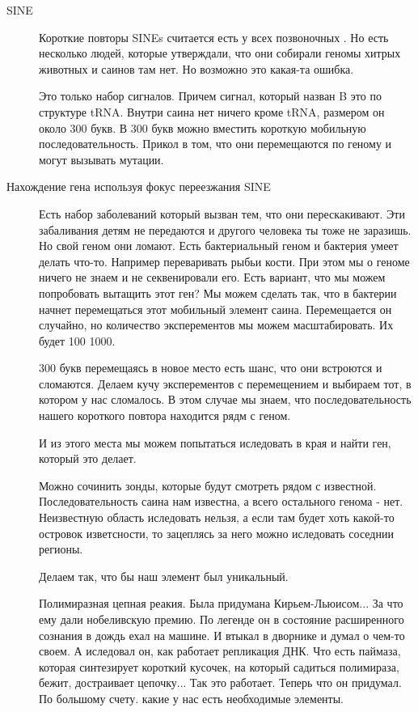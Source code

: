 \begin{description}
\item[SINE]
Короткие повторы SINEs считается есть у всех позвоночных . Но есть несколько людей, 
которые утверждали, что они собирали геномы хитрых животных и саинов там нет. Но возможно это 
какая-та ошибка. 

Это только набор сигналов. Причем сигнал, который назван B это по структуре tRNA. Внутри саина нет
ничего кроме tRNA, размером он около 300 букв. В 300 букв можно вместить короткую
мобильную последовательность. Прикол в том, что они перемещаются по геному и могут вызывать мутации.

\item[Нахождение гена используя фокус переезжания SINE]
Есть набор заболеваний который вызван тем, что они перескакивают.
Эти забаливания детям не передаются и другого человека ты тоже не заразишь.
Но свой геном они ломают. Есть бактериальный геном и бактерия умеет делать что-то.
Например переваривать рыбьи кости. При этом мы о геноме ничего не знаем и не секвенировали его.
Есть вариант, что мы можем попробовать вытащить этот ген?
Мы можем сделать так, что в бактерии начнет перемещаться этот мобильный элемент саина.
Перемещается он случайно, но количество эксперементов мы можем
масштабировать. Их будет 100 1000.

300 букв перемещаясь в новое место есть шанс, что они встроются и
сломаются. Делаем кучу эксперементов с перемещением и выбираем тот,
в котором у нас сломалось. В этом случае мы знаем, что последовательность
нашего короткого повтора находится рядм с геном.

И из этого места мы можем попытаться иследовать в края и найти ген,
который это делает.

Можно сочинить зонды, которые будут смотреть рядом с известной. Последовательность
саина нам известна, а всего остального генома - нет. Неизвестную область иследовать нельзя,
а если там будет хоть какой-то островок изветсности, то зацеплясь за него можно
иследовать соседнии регионы.

Делаем так, что бы наш элемент был  уникальный.

Полимиразная цепная реакия. Была придумана Кирьем-Льюисом... За что ему дали
нобеливскую премию. По легенде
он в состояние расширенного сознания в дождь ехал на машине.
И втыкал в дворнике и думал о чем-то своем. А иследовал он, как
работает репликация ДНК. Что есть паймаза, которая
синтезирует короткий кусочек, на который садиться полимираза,
бежит, достраивает цепочку... Так это работает. Теперь что
он придумал. По большому счету. какие
у нас есть необходимые элементы.


\end{description}
